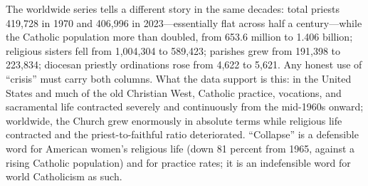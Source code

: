 The worldwide series tells a different story in the same decades: total priests 419,728 in 1970 and 406,996 in 2023---essentially flat across half a century---while the Catholic population more than doubled, from 653.6 million to 1.406 billion; religious sisters fell from 1,004,304 to 589,423; parishes grew from 191,398 to 223,834; diocesan priestly ordinations rose from 4,622 to 5,621. Any honest use of ``crisis'' must carry both columns. What the data support is this: in the United States and much of the old Christian West, Catholic practice, vocations, and sacramental life contracted severely and continuously from the mid-1960s onward; worldwide, the Church grew enormously in absolute terms while religious life contracted and the priest-to-faithful ratio deteriorated. ``Collapse'' is a defensible word for American women's religious life (down 81 percent from 1965, against a rising Catholic population) and for practice rates; it is an indefensible word for world Catholicism as such.

